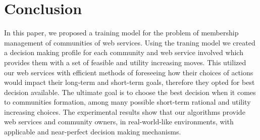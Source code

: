 \documentclass[10pt,journal,cspaper,compsoc]{IEEEtran}
\begin{document}
%





\section{Conclusion}\label{s:conclusion}

In this paper, we proposed a training model for the problem of membership management of communities of web services. Using the traning model we created a decision making profile for each community and web service involved which provides them with a set of feasible and utility increasing moves. This utilized our web services with efficient methods of foreseeing how their choices of actions would impact their long-term and short-term goals, therefore they opted for best decision available. The ultimate goal is to choose the best decision when it comes to communities formation, among many possible short-term rational and utility increasing choices. The experimental results show that our algorithms provide web services and community owners, in real-world-like environments, with applicable and near-perfect decision making mechanisms.
\end{document}
